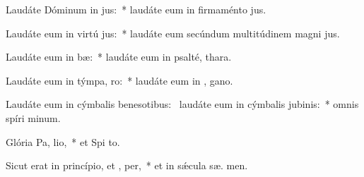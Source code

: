 \item Laudáte Dóminum in  jus:~* laudáte eum in firmaménto  jus.
\item Laudáte eum in virtú jus:~* laudáte eum secúndum multitúdinem magni jus.
\item Laudáte eum in  bæ:~* laudáte eum in psalté,  thara.
\item Laudáte eum in týmpa,  ro:~* laudáte eum in ,  gano.
\item Laudáte eum in cýmbalis benesotibus:~\pscross{} laudáte eum in cýmbalis jubinis:~* omnis spíri  minum.
\item Glória Pa,  lio,~* et Spi to.
\item Sicut erat in princípio, et ,  per,~* et in sǽcula sæ. men.
